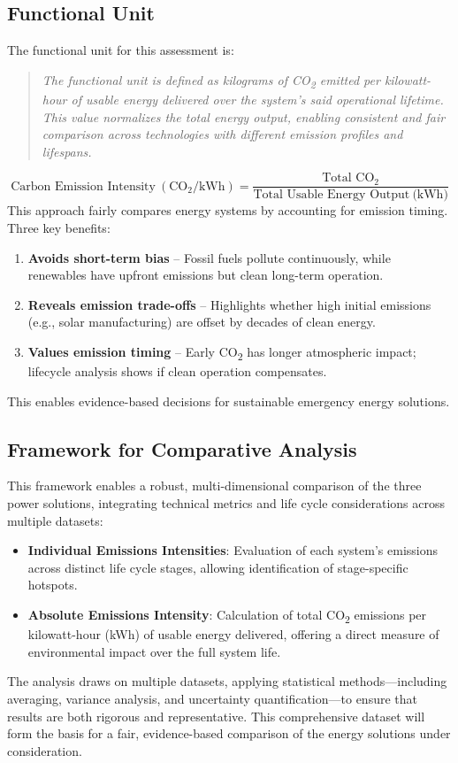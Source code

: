 \documentclass{article}
\begin{document}
\subsection{Functional Unit}

The functional unit for this assessment is:  
\begin{quote}
	\textit{The functional unit is defined as kilograms of CO\textsubscript{2} emitted per kilowatt-hour of usable energy delivered over the system's said operational lifetime. This value normalizes the total energy output, enabling consistent and fair comparison across technologies with different emission profiles and lifespans.}
\end{quote}
\vspace{1em}
\begin{equation}
\text{Carbon Emission Intensity}\ (\text{CO}_2/\text{kWh}) =\frac{\text{Total  CO}_2}{\text{Total Usable Energy Output}\ \text{(kWh)}}
\label{normalco}
\end{equation}
This approach fairly compares energy systems by accounting for emission timing. Three key benefits:
\begin{enumerate}
	\item \textbf{Avoids short-term bias} -- Fossil fuels pollute continuously, while renewables have upfront emissions but clean long-term operation.
	\item \textbf{Reveals emission trade-offs} -- Highlights whether high initial emissions (e.g., solar manufacturing) are offset by decades of clean energy.
	\item \textbf{Values emission timing} -- Early CO\textsubscript{2} has longer atmospheric impact; lifecycle analysis shows if clean operation compensates.
\end{enumerate}
This enables evidence-based decisions for sustainable emergency energy solutions.

\subsection{Framework for Comparative Analysis}
This framework enables a robust, multi-dimensional comparison of the three power solutions, integrating technical metrics and life cycle considerations across multiple datasets:
\begin{itemize}[itemsep=-1mm]
	\item \textbf{Individual Emissions Intensities}: Evaluation of each system's emissions across distinct life cycle stages, allowing identification of stage-specific hotspots.
	\item \textbf{Absolute Emissions Intensity}: Calculation of total CO\textsubscript{2} emissions per kilowatt-hour (kWh) of usable energy delivered, offering a direct measure of environmental impact over the full system life.
\end{itemize}
The analysis draws on multiple datasets, applying statistical methods—including averaging, variance analysis, and uncertainty quantification—to ensure that results are both rigorous and representative. This comprehensive dataset will form the basis for a fair, evidence-based comparison of the energy solutions under consideration.
\newpage
\end{document}
